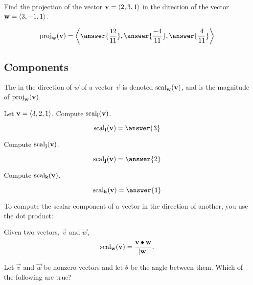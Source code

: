 \documentclass{ximera}
\begin{document}
\begin{question}
  Find the projection of the vector $\mathbf{v} = \left\langle 2,3,1\right\rangle$ in the
  direction of the vector $\mathbf{w} = \left\langle 3,-1,1\right\rangle$.
  \begin{prompt}
  \[
  \proj_\vec{w}(\vec{v}) = \vector{\answer{\frac{12}{11}},\answer{\frac{-4}{11}},\answer{\frac{4}{11}}}
  \]
  \end{prompt}
\end{question}

\subsection{Components}

\begin{definition}
  The  in the direction of
  $\vec{w}$ of a vector $\vec{v}$ is denoted $\operatorname{scal}_\mathbf{w}(\mathbf{v})$,
  and is the magnitude of $\operatorname{proj}_\mathbf{w}(\mathbf{v})$.
\end{definition}

\begin{question}
  Let $\mathbf{v} = \left\langle 3,2,1\right\rangle$. Compute $\operatorname{scal}_{\mathbf{i}}(\mathbf{v})$.
  \begin{prompt}
    \[
    \scal_\veci(\vec{v}) = \answer{3}
    \]
  \end{prompt}
  \begin{question}
    Compute $\operatorname{scal}_{\mathbf{j}}(\mathbf{v})$.
    \begin{prompt}
      \[
      \scal_\vecj(\vec{v}) = \answer{2}
      \]
    \end{prompt}
    \begin{question}
      Compute $\operatorname{scal}_{\mathbf{k}}(\mathbf{v})$.
      \begin{prompt}
        \[
        \scal_\veck(\vec{v}) = \answer{1}
        \]
      \end{prompt}
    \end{question}
  \end{question}
\end{question}
To compute the scalar component of a vector in the direction of
another, you use the dot product:

\begin{theorem}
  Given two vectors, $\vec{v}$ and $\vec{w}$,
  \[
  \operatorname{scal}_\mathbf{w}(\mathbf{v}) =\frac{\mathbf{v} \bullet \mathbf{w}}{|\mathbf{w}|}.
  \]
\end{theorem}

\begin{question}
  Let $\vec{v}$ and $\vec{w}$ be nonzero vectors and let $\theta$ be
  the angle between them. Which of the following are true?
  \begin{selectAll}
  \end{selectAll}
\end{question}
\end{document}
